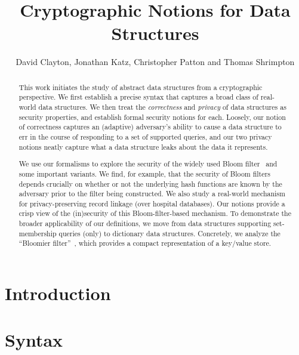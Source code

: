 \documentclass[11pt, pdftex]{article}
\title{\bf Cryptographic Notions for Data Structures}
\author{David Clayton, Jonathan Katz, Christopher Patton and Thomas Shrimpton}
\begin{document}
\maketitle

\begin{abstract}
  This work initiates the study of abstract data structures from a cryptographic
  perspective.  We first establish a precise syntax that captures a broad
  class of real-world data structures.  We then treat the
  \emph{correctness} and \emph{privacy} of data structures
  as security properties, and establish formal security notions for
  each.  Loosely, our notion of correctness captures an (adaptive) adversary's ability to cause
  a data structure to err in the course of responding to a set of supported
  queries, and our two privacy notions neatly capture what a data structure leaks about
  the data it represents.

  We use our formalisms to explore the security of the widely used
  Bloom filter~\cite{bloom1970space} and some important variants.
  We find, for example, that the security of Bloom filters depends
  crucially on whether or not the underlying hash functions are known
  by the adversary prior to the filter being constructed.
  We also study a real-world mechanism for privacy-preserving record
  linkage (over hospital databases).  Our notions provide a crisp view of the
  (in)security of this Bloom-filter-based mechanism. 
  To demonstrate the broader applicability of our definitions, we move
  from data structures supporting set-membership queries (only) to
  dictionary data structures.  Concretely, we analyze the ``Bloomier
  filter''~\cite{chazelle2004bloomier}, which provides a compact
  representation of a key/value store.

\end{abstract}


\section{Introduction}


\section{Syntax}

\end{document}
